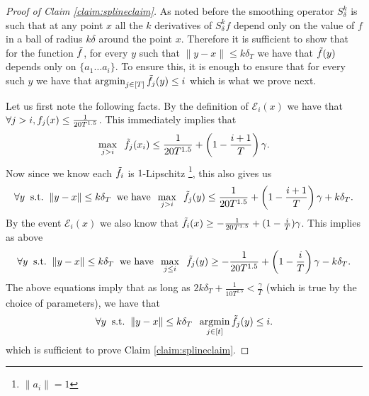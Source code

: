 \begin{proof}[Proof of Claim \ref{claim:splineclaim}]
   As noted before the smoothing operator $S^k_{\delta}$ is such that at any point $x$ all the $k$ derivatives of $S^k_{\delta} f$ depend only on the value of $f$ in a ball of radius $k \delta$ around the point $x$. Therefore  it is sufficient to show that for the function $\tilde{f}$, for every $y$ such that $\|y - x\| \leq k\delta_T$ we have that $\tilde{f}(y)$ depends only on $\{a_1 \ldots a_{i}\}$. To ensure this, it is enough to ensure that for every such $y$ we have that $\operatorname*{argmin}_{j \in [T]} \tilde{f}_j(y) \leq i$ which is what we prove next.

Let us first note the following facts. By the definition of $\mathcal{E}_i(x)$ we have that $\forall j > i, f_j(x) \leq \frac{1}{20T^{1.5}}$. This immediately implies that             
\begin{equation}
\max_{j > i} \;\; \tilde{f}_j(x_i) \leq \frac{1}{20T^{1.5}} + \left(1 - \frac{i+1}{T} \right) \gamma.
\end{equation}
Now since we know each $\tilde{f}_i$ is $1$-Lipschitz \footnote{$\|a_i\| = 1$}, this also gives us 
\begin{equation}
\forall y \;\;\text{s.t.}\;\;\|y - x\| \leq k\delta_T \;\;\text{we have}\;\;\max_{j > i} \;\; \tilde{f}_j(y) \leq \frac{1}{20T^{1.5}} + \left(1 - \frac{i+1}{T} \right) \gamma + k\delta_T. 
\end{equation}
By the event $\mathcal{E}_i(x)$ we also know that $\tilde{f}_i(x) \geq -\frac{1}{20T^{1.5}} + (1 - \frac{i}{T})\gamma$.
This implies as above 
\begin{equation}
\forall y \;\;\text{s.t.}\;\;\|y - x\| \leq k\delta_T \;\;\text{we have}\;\;\max_{j \leq i} \;\; \tilde{f}_j(y) \geq - \frac{1}{20T^{1.5}} + \left(1 - \frac{i}{T} \right) \gamma - k\delta_T. 
\end{equation}
The above equations imply that as long as $2k\delta_T + \frac{1}{10T^{1.5}} < \frac{\gamma}{T}$ (which is true by the choice of parameters), we have that  
\begin{equation}
\forall y \;\;\text{s.t.}\;\;\|y - x\| \leq k\delta_T \;\; \operatorname*{argmin}_{j \in [t]} \tilde{f}_j(y) \leq i. 
\end{equation}
which is sufficient to prove Claim \ref{claim:splineclaim}.
 \end{proof} 
